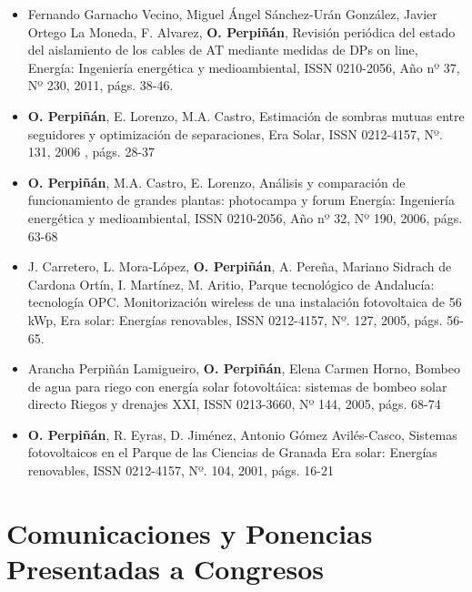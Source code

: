 \documentclass[article, a4paper]{memoir}
\begin{document}
\begin{itemize}
\item Fernando Garnacho Vecino, Miguel Ángel Sánchez-Urán González, Javier
Ortego La Moneda, F. Alvarez, \textbf{O. Perpiñán},
Revisión periódica del estado del aislamiento de los cables de
AT mediante medidas de DPs on line, Energía: Ingeniería
energética y medioambiental, ISSN 0210-2056, Año nº 37, Nº
230, 2011, págs. 38-46.

\item \textbf{O. Perpiñán}, E. Lorenzo, M.A. Castro, Estimación de sombras mutuas
entre seguidores y optimización de separaciones, Era Solar, ISSN
0212-4157, Nº. 131, 2006 , págs. 28-37

\item \textbf{O. Perpiñán}, M.A. Castro, E. Lorenzo, Análisis y
comparación de funcionamiento de grandes plantas: photocampa y forum
Energía: Ingeniería energética y medioambiental, ISSN 0210-2056, Año
nº 32, Nº 190, 2006, págs. 63-68

\item J. Carretero, L. Mora-López, \textbf{O. Perpiñán}, A. Pereña, Mariano Sidrach
de Cardona Ortín, I. Martínez, M. Aritio, Parque tecnológico de
Andalucía: tecnología OPC. Monitorización wireless de una
instalación fotovoltaica de 56 kWp, Era solar: Energías renovables,
ISSN 0212-4157, Nº. 127, 2005, págs. 56-65.

\item Arancha Perpiñán Lamigueiro, \textbf{O. Perpiñán}, Elena Carmen
Horno, Bombeo de agua para riego con energía solar fotovoltáica:
sistemas de bombeo solar directo Riegos y drenajes XXI, ISSN
0213-3660, Nº 144, 2005, págs. 68-74

\item \textbf{O. Perpiñán}, R. Eyras, D. Jiménez, Antonio Gómez
Avilés-Casco, Sistemas fotovoltaicos en el Parque de las
Ciencias de Granada Era solar: Energías renovables, ISSN
0212-4157, Nº. 104, 2001, págs. 16-21
\end{itemize}

\section{Comunicaciones y Ponencias Presentadas a Congresos}
\label{sec-6}
\end{document}
